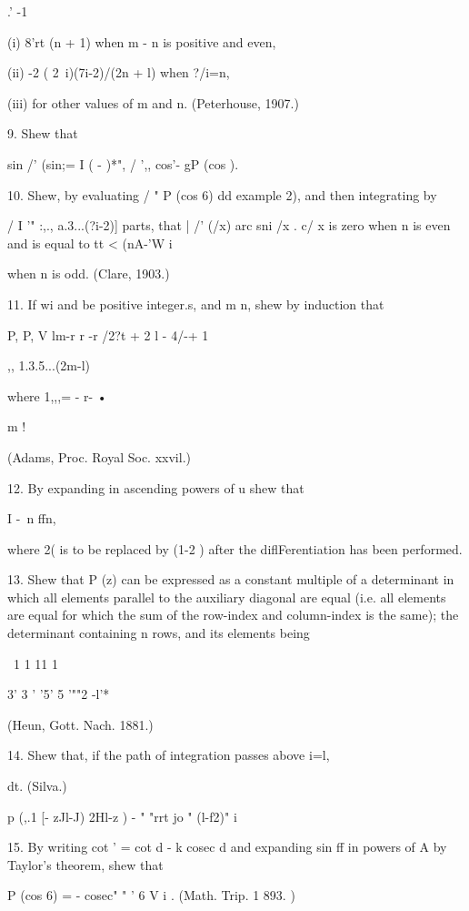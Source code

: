 {{{{.' -1

(i) 8'rt (n + 1) when m - n is positive and even,

(ii) -2 ( 2\ i)(7i-2)/(2n + l) when ?/i=n,

(iii) for other values of m and n. (Peterhouse, 1907.)

9. Shew that

sin /' (sin;= I ( - )*", / ',, cos'- gP (cos ).


10. Shew, by evaluating / " P (cos 6) dd  example 2), and then
integrating by

/ I '" :,., a.3...(?i-2)] parts, that | /' (/x) arc sni /x . c/ x is
zero when n is even and is equal to tt < (nA-'W i

when n is odd. (Clare, 1903.)

11. If wi and be positive integer.s, and m n, shew by induction that

P, P, V lm-r r -r /2?t + 2 l - 4/-+ 1 \

,, 1.3.5...(2m-l)

where 1,,,= - r- •

m !

(Adams, Proc. Royal Soc. xxvil.)

12. By expanding in ascending powers of u shew that

I -\ n ffn,

where 2( is to be replaced by (1-2 ) after the diflFerentiation has
been performed.

13. Shew that P (z) can be expressed as a constant multiple of a
determinant in which all elements parallel to the auxiliary diagonal
are equal (i.e. all elements are equal for which the sum of the
row-index and column-index is the same); the determinant containing n
rows, and its elements being

\ 1 1 11 1

3' 3 ' '5' 5 '""2 -l'*

(Heun, Gott. Nach. 1881.)

14. Shew that, if the path of integration passes above i=l,

dt. (Silva.)

p (,.1 [- zJl-J) 2Hl-z ) - " "rrt jo " (l-f2)" i

15. By writing cot ' = cot d - k cosec d and expanding sin ff in
powers of A by Taylor's theorem, shew that

P (cos 6) = - cosec" " ' 6 V i . (Math. Trip. 1 893. )

}}}}
